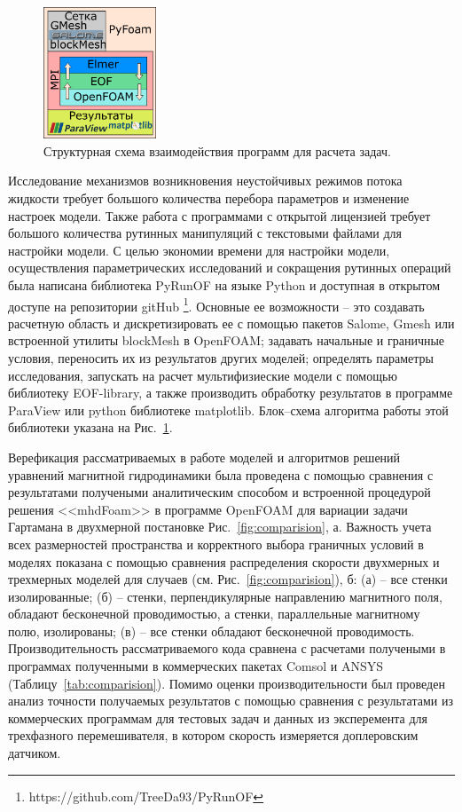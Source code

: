 \begin{figure}
	\centering
	\includegraphics[width=0.3\textwidth]{Synopsis/images/part2/GeneralChartFlow_ru.png}
	\caption{Структурная схема взаимодействия программ для расчета задач.}
	\label{fig:solver}	
\end{figure}
Исследование механизмов возникновения неустойчивых режимов потока жидкости требует большого количества перебора параметров и изменение настроек модели. Также работа с программами с открытой лицензией требует большого количества рутинных манипуляций с текстовыми файлами для настройки модели. С целью экономии времени для настройки модели, осуществления параметрических исследований и сокращения рутинных операций была написана библиотека PyRunOF
на языке  Python и доступная в открытом доступе на репозитории gitHub \footnote{https://github.com/TreeDa93/PyRunOF}. Основные ее возможности -- это создавать расчетную область и дискретизировать ее с помощью пакетов Salome, Gmesh или встроенной утилиты blockMesh в OpenFOAM; задавать начальные и граничные условия, переносить их из результатов других моделей; определять параметры исследования, запускать на расчет мультифизиеские модели с помощью библиотеку EOF-library, а также производить обработку результатов в программе ParaView или python библиотеке matplotlib. Блок--схема алгоритма работы этой библиотеки указана на Рис.~\ref{fig:solver}. 

Верефикация рассматриваемых в работе моделей и алгоритмов решений уравнений магнитной гидродинамики была проведена с помощью сравнения с результатами получеными аналитическим способом и встроенной процедурой решения <<mhdFoam>> в программе OpenFOAM для вариации задачи Гартамана в двухмерной постановке Рис.~\ref{fig:comparision}, а. 
Важность учета всех размерностей пространства и корректного выбора граничных условий в моделях показана с помощью сравнения распределения скорости двухмерных и трехмерных моделей 
для случаев (см. Рис.~\ref{fig:comparision}), б: (а) -- все стенки изолированные; (б) -- стенки, перпендикулярные направлению магнитного поля, обладают бесконечной проводимостью, а стенки, параллельные магнитному полю, изолированы; (в) -- все стенки обладают бесконечной проводимость. Производительность рассматриваемого кода сравнена с расчетами получеными в программах полученными в коммерческих пакетах Comsol и ANSYS (Таблицу~\ref{tab:comparision}). Помимо оценки производительности был проведен анализ точности получаемых результатов с помощью сравнения с результатами из коммерческих программам для тестовых задач и данных из эксперемента для трехфазного перемешивателя, в котором скорость измеряется доплеровским датчиком.


